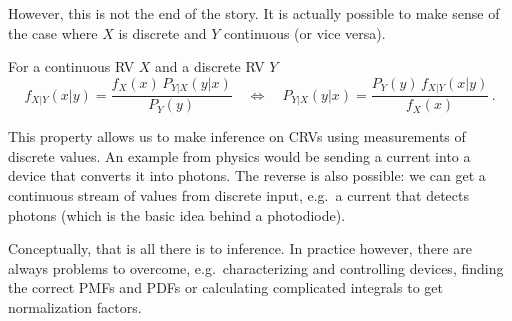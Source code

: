 However, this is not the end of the story. It is actually possible to make sense of the case where $X$ is discrete and $Y$ continuous (or vice versa).
\begin{prop}
For a continuous RV $X$ and a discrete RV $Y$
\begin{equation}
f_{X | Y}(x | y) = \frac{f_X(x) \, P_{Y | X}(y | x)}{P_Y(y)} \quad \Leftrightarrow \quad P_{Y | X}(y | x) = \frac{P_Y(y) \, f_{X | Y}(x | y)}{f_X(x)} \, .
\end{equation}
\end{prop}


This property allows us to make inference on CRVs using measurements of discrete values. An example from physics would be sending a current into a device that converts it into photons. The reverse is also possible: we can get a continuous stream of values from discrete input, e.g.~a current that detects photons (which is the basic idea behind a photodiode).

Conceptually, that is all there is to inference. In practice however, there are always problems to overcome, e.g.~characterizing and controlling devices, finding the correct PMFs and PDFs or calculating complicated integrals to get normalization factors.


